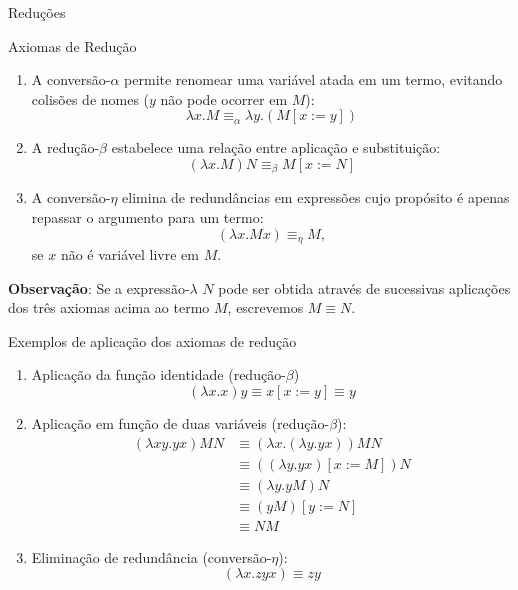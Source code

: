 \begin{frame}[fragile]{Reduções}

    \begin{footnotesize}
    \begin{block}{Axiomas de Redução}
        \begin{enumerate}
            \item A conversão-$\alpha$ permite renomear uma variável atada em um termo,
                evitando colisões de nomes ($y$ não pode ocorrer em $M$):
            \[
                \lambda x.M \equiv_\alpha \lambda y.(M[x:=y])
            \]

            \item A redução-$\beta$ estabelece uma relação entre aplicação e substituição:
            \[
                (\lambda x.M)N \equiv_\beta M[x:=N]
            \]

            \item A  conversão-$\eta$ elimina de redundâncias em expressões cujo
                propósito é apenas repassar o argumento para um termo:
            \[
                (\lambda x.Mx) \equiv_\eta M,
            \]
            se $x$ não é variável livre em $M$.
        \end{enumerate}
    \end{block}

    \textbf{Observação}: Se a expressão-$\lambda$ $N$ pode ser obtida através de sucessivas 
        aplicações dos três axiomas acima ao termo $M$, escrevemos $M\equiv N$.
    \end{footnotesize}
\end{frame}

\begin{frame}[fragile]{Exemplos de aplicação dos axiomas de redução}

    \begin{enumerate}
        \item Aplicação da função identidade (redução-$\beta$)
        \[
            (\lambda x.x)y \equiv x[x:=y] \equiv y
        \]

        \item Aplicação em função de duas variáveis (redução-$\beta$):
        \begin{align*}
            (\lambda xy.yx)MN & \equiv (\lambda x.(\lambda y.yx))MN \\
            & \equiv ((\lambda y.yx)[x:=M])N \\
            & \equiv (\lambda y.yM)N \\
            & \equiv (yM)[y:=N] \\
            & \equiv NM
        \end{align*}

        \item Eliminação de redundância (conversão-$\eta$):
        \[
            (\lambda x.zyx) \equiv zy
        \]
    \end{enumerate}

\end{frame}

